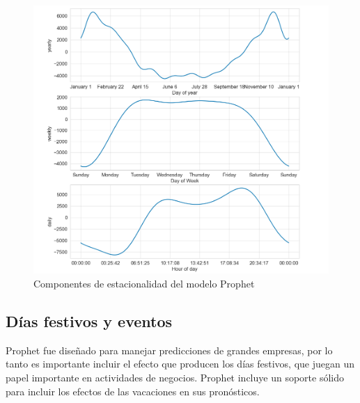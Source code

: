 \documentclass[12pt,twoside]{article}
\begin{document}
\begin{center}
\begin{figure}[h]
    \includegraphics[width = \textwidth]{imagenes/prophet_comp.png}
    \caption{Componentes de estacionalidad del modelo Prophet}\label{fig:prophet_comp}
\end{figure}
\end{center}



\newpage
\subsection{Días festivos y eventos}
Prophet fue diseñado para manejar predicciones de grandes empresas, por lo tanto es importante incluir el efecto que producen los días festivos, que juegan un papel importante en actividades de negocios. Prophet incluye un soporte sólido para incluir los efectos de las vacaciones en sus pronósticos. 
\end{document}
